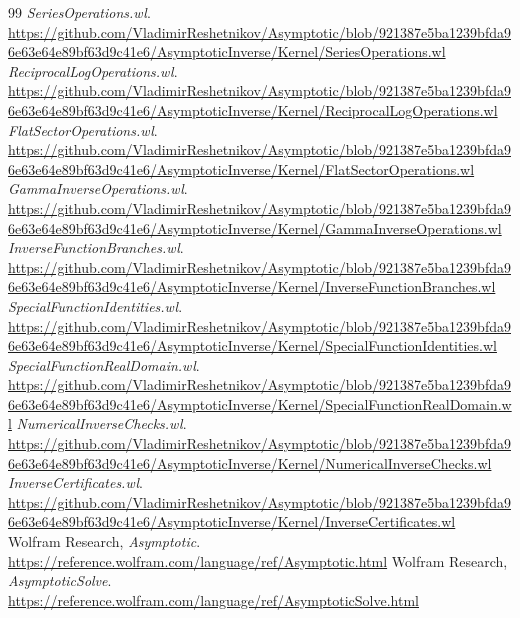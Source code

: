 \documentclass[11pt,letterpaper]{article}
\begin{document}
\begin{thebibliography}{99}
 \emph{SeriesOperations.wl}.\newline
\url{https://github.com/VladimirReshetnikov/Asymptotic/blob/921387e5ba1239bfda96e63e64e89bf63d9c41e6/AsymptoticInverse/Kernel/SeriesOperations.wl}
 \emph{ReciprocalLogOperations.wl}.\newline
\url{https://github.com/VladimirReshetnikov/Asymptotic/blob/921387e5ba1239bfda96e63e64e89bf63d9c41e6/AsymptoticInverse/Kernel/ReciprocalLogOperations.wl}
 \emph{FlatSectorOperations.wl}.\newline
\url{https://github.com/VladimirReshetnikov/Asymptotic/blob/921387e5ba1239bfda96e63e64e89bf63d9c41e6/AsymptoticInverse/Kernel/FlatSectorOperations.wl}
 \emph{GammaInverseOperations.wl}.\newline
\url{https://github.com/VladimirReshetnikov/Asymptotic/blob/921387e5ba1239bfda96e63e64e89bf63d9c41e6/AsymptoticInverse/Kernel/GammaInverseOperations.wl}
 \emph{InverseFunctionBranches.wl}.\newline
\url{https://github.com/VladimirReshetnikov/Asymptotic/blob/921387e5ba1239bfda96e63e64e89bf63d9c41e6/AsymptoticInverse/Kernel/InverseFunctionBranches.wl}
 \emph{SpecialFunctionIdentities.wl}.\newline
\url{https://github.com/VladimirReshetnikov/Asymptotic/blob/921387e5ba1239bfda96e63e64e89bf63d9c41e6/AsymptoticInverse/Kernel/SpecialFunctionIdentities.wl}
 \emph{SpecialFunctionRealDomain.wl}.\newline
\url{https://github.com/VladimirReshetnikov/Asymptotic/blob/921387e5ba1239bfda96e63e64e89bf63d9c41e6/AsymptoticInverse/Kernel/SpecialFunctionRealDomain.wl}
 \emph{NumericalInverseChecks.wl}.\newline
\url{https://github.com/VladimirReshetnikov/Asymptotic/blob/921387e5ba1239bfda96e63e64e89bf63d9c41e6/AsymptoticInverse/Kernel/NumericalInverseChecks.wl}
 \emph{InverseCertificates.wl}.\newline
\url{https://github.com/VladimirReshetnikov/Asymptotic/blob/921387e5ba1239bfda96e63e64e89bf63d9c41e6/AsymptoticInverse/Kernel/InverseCertificates.wl}
 Wolfram Research, \emph{Asymptotic}.\newline
\url{https://reference.wolfram.com/language/ref/Asymptotic.html}
 Wolfram Research, \emph{AsymptoticSolve}.\newline
\url{https://reference.wolfram.com/language/ref/AsymptoticSolve.html}

\end{thebibliography}
\end{document}
